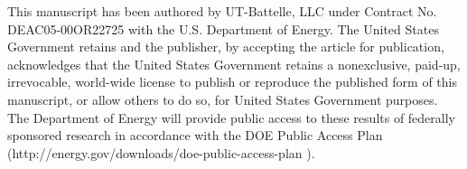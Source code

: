 \documentclass[conference]{IEEEtran}
\begin{document}
This manuscript has been authored by UT-Battelle, LLC under Contract No.
DEAC05-00OR22725 with the U.S. Department of Energy. The United States
Government retains and the publisher, by accepting the article for publication,
acknowledges that the United States Government retains a nonexclusive, paid-up,
irrevocable, world-wide license to publish or reproduce the published form of
this manuscript, or allow others to do so, for United States Government
purposes. The Department of Energy will provide public access to these results
of federally sponsored research in accordance with the DOE Public Access Plan
(http://energy.gov/downloads/doe-public-access-plan ).










\end{document}
